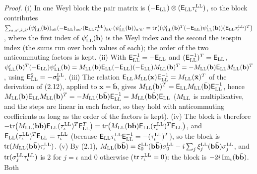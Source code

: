 \documentclass[
  10pt,
]{article}
\begin{document}
\emph{Proof.} (i) In one Weyl block the pair matrix is
\((-\mathsf E_{\rm LL})\otimes(\mathsf E_{\rm LL}\tau^{\rm LL}_\iota)\),
so the block contributes
\(\sum_{a,a',k,k'}(\psi'_{\rm LL}(\mathbf b))_{ak}(-\mathsf E_{\rm LL})_{aa'}(\mathsf E_{\rm LL}\tau^{\rm LL}_\iota)_{kk'}(\psi'_{\rm LL}(\mathbf b))_{a'k'}=\mathrm{tr}\big((\psi'_{\rm LL}(\mathbf b)^T(-\mathsf E_{\rm LL})\psi'_{\rm LL}(\mathbf b))(\mathsf E_{\rm LL}\tau^{\rm LL}_\iota)^T\big)\),
where the first index of \(\psi'_{\rm LL}(\mathbf b)\) is the Weyl index
and the second the isospin index (the sums run over both values of
each); the order of the two anticommuting factors is kept. (ii) With
\(\mathsf E^{-1}_{\rm LL}=-\mathsf E_{\rm LL}\) and
\((\mathsf E^{-1}_{\rm LL})^T=\mathsf E_{\rm LL}\),
\(\psi'_{\rm LL}(\mathbf b)^T(-\mathsf E_{\rm LL})\psi'_{\rm LL}(\mathbf b)=M_{\rm LL}(\mathbf b)\mathsf E_{\rm LL}(-\mathsf E_{\rm LL})(-\mathsf E_{\rm LL})M_{\rm LL}(\mathbf b)^T=-M_{\rm LL}(\mathbf b)\mathsf E_{\rm LL}M_{\rm LL}(\mathbf b)^T\),
using \(\mathsf E_{\rm LL}^2=-\sigma^{\rm LL}_0\). (iii) The relation
\(\mathsf E_{\rm LL}M_{\rm LL}(\mathbf x)\mathsf E^{-1}_{\rm LL}=M_{\rm LL}(\bar{\mathbf x})^T\)
of the derivation of (2.12), applied to \(\mathbf x=\bar{\mathbf b}\),
gives
\(M_{\rm LL}(\mathbf b)^T=\mathsf E_{\rm LL}M_{\rm LL}(\bar{\mathbf b})\mathsf E^{-1}_{\rm LL}\),
hence
\(M_{\rm LL}(\mathbf b)\mathsf E_{\rm LL}M_{\rm LL}(\mathbf b)^T=-M_{\rm LL}(\mathbf b\bar{\mathbf b})\mathsf E^{-1}_{\rm LL}=M_{\rm LL}(\mathbf b\bar{\mathbf b})\mathsf E_{\rm LL}\)
(\(M_{\rm LL}\) is multiplicative, and the steps are linear in each
factor, so they hold with anticommuting coefficients as long as the
order of the factors is kept). (iv) The block is therefore
\(-\mathrm{tr}\big(M_{\rm LL}(\mathbf b\bar{\mathbf b})\mathsf E_{\rm LL}(\tau^{\rm LL}_\iota)^T\mathsf E^T_{\rm LL}\big)=\mathrm{tr}\big(M_{\rm LL}(\mathbf b\bar{\mathbf b})\mathsf E_{\rm LL}(\tau^{\rm LL}_\iota)^T\mathsf E_{\rm LL}\big)\),
and
\(\mathsf E_{\rm LL}(\tau^{\rm LL}_\iota)^T\mathsf E_{\rm LL}=\tau^{\rm LL}_\iota\)
(because
\(\mathsf E_{\rm LL}\tau^{\rm LL}_\iota\mathsf E^{-1}_{\rm LL}=-(\tau^{\rm LL}_\iota)^T\)),
so the block is
\(\mathrm{tr}(M_{\rm LL}(\mathbf b\bar{\mathbf b})\tau^{\rm LL}_\iota)\).
(v) By (2.1),
\(M_{\rm LL}(\mathbf b\bar{\mathbf b})=\xi^{\rm LL}_0(\mathbf b\bar{\mathbf b})\sigma^{\rm LL}_0-i\sum_j\xi^{\rm LL}_j(\mathbf b\bar{\mathbf b})\sigma^{\rm LL}_j\),
and \(\mathrm{tr}(\sigma^{\rm LL}_j\tau^{\rm LL}_\iota)\) is 2 for
\(j=\iota\) and 0 otherwise (\(\mathrm{tr}\,\tau^{\rm LL}_\iota=0\)):
the block is \(-2i\,{\rm Im}_\iota(\mathbf b\bar{\mathbf b})\). Both
\end{document}
